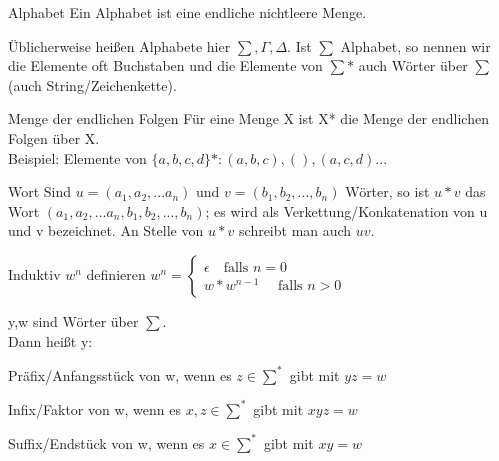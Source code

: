 \documentclass[avery5371, frame]{flashcards}
\begin{document}

\begin{flashcard}[Definition]{Alphabet}
    Ein Alphabet ist eine endliche nichtleere Menge.

    Üblicherweise heißen Alphabete hier $\sum, \Gamma, \Delta$. Ist $\sum$ Alphabet, so nennen wir die Elemente oft Buchstaben und die Elemente von $\sum*$ auch Wörter über $\sum$ (auch String/Zeichenkette).
\end{flashcard}

\begin{flashcard}[Definition]{Menge der endlichen Folgen}
    Für eine Menge X ist X* die Menge der endlichen Folgen über X.\\

    Beispiel: Elemente von $\{a,b,c,d\}*:(a,b,c),(),(a,c,d)...$
\end{flashcard}

\begin{flashcard}[Definition]{Wort}
    Sind $u=(a_1, a_2, ...a_n)$ und $v=(b_1, b_2,...,b_n)$ Wörter, so ist $u*v$ das Wort $(a_1,a_2,...a_n,b_1,b_2,...,b_n)$; es wird als Verkettung/Konkatenation von u und v bezeichnet.
    An Stelle von $u*v$ schreibt man auch $uv$.
\end{flashcard}

\begin{flashcard}[Definition]{Induktiv $w^n$ definieren}
    $w^n = \begin{cases} \epsilon \quad\text{falls } n=0 \\ {w * w^{n-1}} \quad\text{ falls } n>0 \end{cases}$
\end{flashcard}

\begin{flashcard}[Definition]{y,w sind Wörter über $\sum$.\\ Dann heißt y:}
    \begin{itemize*}
        \item Präfix/Anfangsstück von w, wenn es $z\in\sum^*$ gibt mit $yz=w$
        \item Infix/Faktor von w, wenn es $x,z\in\sum^*$ gibt mit $xyz = w$
        \item Suffix/Endstück von w, wenn es $x\in\sum^*$ gibt mit $xy=w$
    \end{itemize*}
\end{flashcard}
\end{document}
